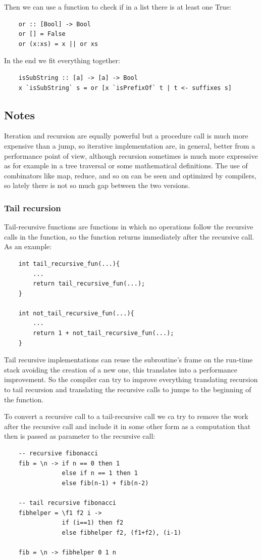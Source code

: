 Then we can use a function to check if in a list there is at least one True:
\begin{verbatim}
    or :: [Bool] -> Bool
    or [] = False
    or (x:xs) = x || or xs
\end{verbatim}

In the end we fit everything together:
\begin{verbatim}
    isSubString :: [a] -> [a] -> Bool
    x `isSubString` s = or [x `isPrefixOf` t | t <- suffixes s]
\end{verbatim}

\subsection{Notes}
Iteration and recursion are equally powerful but a procedure call is much more expensive than a jump, so iterative implementation are, in general, better from a performance point of view, although recursion sometimes is much more expressive as for example in a tree traversal or some mathematical definitions.
The use of combinators like map, reduce, and so on can be seen and optimized by compilers, so lately there is not so much gap between the two versions.

\subsubsection{Tail recursion}
Tail-recursive functions are functions in which no operations follow the recursive calls in the function, so the function returns immediately after the recursive call.
As an example:
\begin{verbatim}
    int tail_recursive_fun(...){
        ...
        return tail_recursive_fun(...);
    }

    int not_tail_recursive_fun(...){
        ...
        return 1 + not_tail_recursive_fun(...);
    }
\end{verbatim}
Tail recursive implementations can reuse the subroutine's frame on the run-time stack avoiding the creation of a new one, this translates into a performance improvement.
So the compiler can try to improve everything translating recursion to tail recursion and translating the recursive calls to jumps to the beginning of the function.

To convert a recursive call to a tail-recursive call we ca try to remove the work after the recursive call and include it in some other form as a computation that then is passed as parameter to the recursive call:
\begin{verbatim}
    -- recursive fibonacci
    fib = \n -> if n == 0 then 1
                else if n == 1 then 1
                else fib(n-1) + fib(n-2)

    -- tail recursive fibonacci
    fibhelper = \f1 f2 i ->
                if (i==1) then f2
                else fibhelper f2, (f1+f2), (i-1)

    fib = \n -> fibhelper 0 1 n
\end{verbatim}

